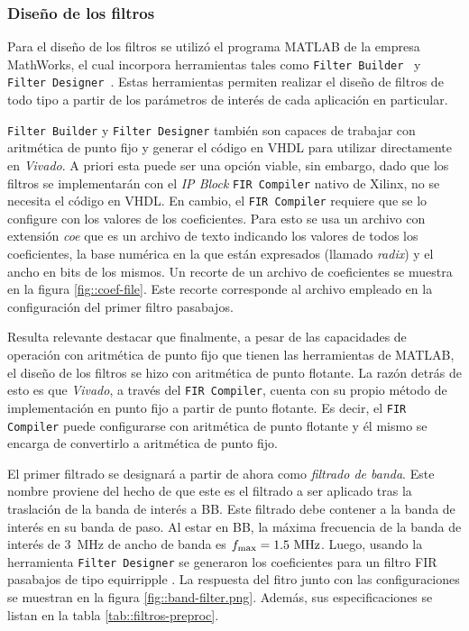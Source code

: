 \documentclass[../../main.tex]{subfiles}
\begin{document}
\subsubsection{Diseño de los filtros}
Para el diseño de los filtros se utilizó el programa MATLAB de la empresa MathWorks, el cual incorpora herramientas tales como \texttt{Filter Builder}~\cite{filter-builder} y \texttt{Filter Designer}~\cite{filter-designer}. Estas herramientas permiten realizar el diseño de filtros de todo tipo a partir de los parámetros de interés de cada aplicación en particular. 

\texttt{Filter Builder} y \texttt{Filter Designer} también son capaces de trabajar con aritmética de punto fijo y generar el código en VHDL para utilizar directamente en \textit{Vivado}. A priori esta puede ser una opción viable, sin embargo, dado que los filtros se implementarán con el \textit{IP Block} \texttt{FIR Compiler} nativo de Xilinx, no se necesita el código en VHDL. En cambio, el \texttt{FIR Compiler} requiere que se lo configure con los valores de los coeficientes. Para esto se usa un archivo con extensión \textit{coe} que es un archivo de texto indicando los valores de todos los coeficientes, la base numérica en la que están expresados (llamado \textit{radix}) y el ancho en bits de los mismos. Un recorte de un archivo de coeficientes se muestra en la figura \ref{fig::coef-file}. Este recorte corresponde al archivo empleado en la configuración del primer filtro pasabajos.

Resulta relevante destacar que finalmente, a pesar de las capacidades de operación con aritmética de punto fijo que tienen las herramientas de MATLAB, el diseño de los filtros se hizo con aritmética de punto flotante. La razón detrás de esto es que \textit{Vivado}, a través del \texttt{FIR Compiler}, cuenta con su propio método de implementación en punto fijo a partir de punto flotante. Es decir, el \texttt{FIR Compiler} puede configurarse con aritmética de punto flotante y él mismo se encarga de convertirlo a aritmética de punto fijo.



El primer filtrado se designará a partir de ahora como \textit{filtrado de banda}. Este nombre proviene del hecho de que este es el filtrado a ser aplicado tras la traslación de la banda de interés a BB. Este filtrado debe contener a la banda de interés en su banda de paso. Al estar en BB, la máxima frecuencia de la banda de interés de 3~MHz de ancho de banda es $f_\textrm{max} = 1.5~\textrm{MHz}$. Luego, usando la herramienta \texttt{Filter Designer} se generaron los coeficientes para un filtro FIR pasabajos de tipo equirripple . La respuesta del fitro junto con las configuraciones se muestran en la figura \ref{fig::band-filter.png}. Además, sus especificaciones se listan en la tabla \ref{tab::filtros-preproc}.
\end{document}

